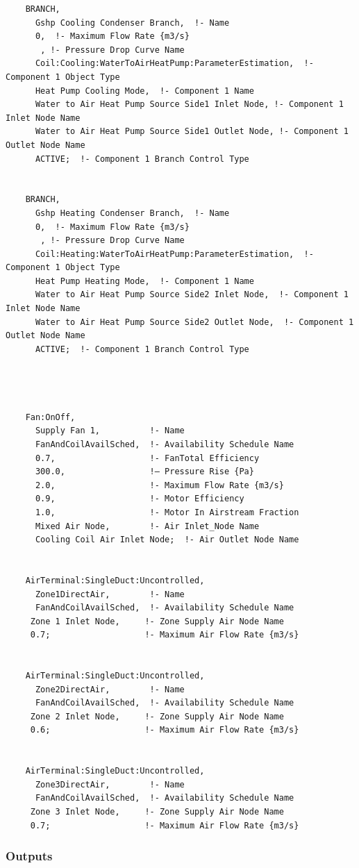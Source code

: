 \begin{lstlisting}
    BRANCH,
      Gshp Cooling Condenser Branch,  !- Name
      0,  !- Maximum Flow Rate {m3/s}
       , !- Pressure Drop Curve Name
      Coil:Cooling:WaterToAirHeatPump:ParameterEstimation,  !- Component 1 Object Type
      Heat Pump Cooling Mode,  !- Component 1 Name
      Water to Air Heat Pump Source Side1 Inlet Node, !- Component 1 Inlet Node Name
      Water to Air Heat Pump Source Side1 Outlet Node, !- Component 1 Outlet Node Name
      ACTIVE;  !- Component 1 Branch Control Type


    BRANCH,
      Gshp Heating Condenser Branch,  !- Name
      0,  !- Maximum Flow Rate {m3/s}
       , !- Pressure Drop Curve Name
      Coil:Heating:WaterToAirHeatPump:ParameterEstimation,  !- Component 1 Object Type
      Heat Pump Heating Mode,  !- Component 1 Name
      Water to Air Heat Pump Source Side2 Inlet Node,  !- Component 1 Inlet Node Name
      Water to Air Heat Pump Source Side2 Outlet Node,  !- Component 1 Outlet Node Name
      ACTIVE;  !- Component 1 Branch Control Type




    Fan:OnOff,
      Supply Fan 1,          !- Name
      FanAndCoilAvailSched,  !- Availability Schedule Name
      0.7,                   !- FanTotal Efficiency
      300.0,                 !– Pressure Rise {Pa}
      2.0,                   !- Maximum Flow Rate {m3/s}
      0.9,                   !- Motor Efficiency
      1.0,                   !- Motor In Airstream Fraction
      Mixed Air Node,        !- Air Inlet_Node Name
      Cooling Coil Air Inlet Node;  !- Air Outlet Node Name


    AirTerminal:SingleDuct:Uncontrolled,
      Zone1DirectAir,        !- Name
      FanAndCoilAvailSched,  !- Availability Schedule Name
     Zone 1 Inlet Node,     !- Zone Supply Air Node Name
     0.7;                   !- Maximum Air Flow Rate {m3/s}


    AirTerminal:SingleDuct:Uncontrolled,
      Zone2DirectAir,        !- Name
      FanAndCoilAvailSched,  !- Availability Schedule Name
     Zone 2 Inlet Node,     !- Zone Supply Air Node Name
     0.6;                   !- Maximum Air Flow Rate {m3/s}


    AirTerminal:SingleDuct:Uncontrolled,
      Zone3DirectAir,        !- Name
      FanAndCoilAvailSched,  !- Availability Schedule Name
     Zone 3 Inlet Node,     !- Zone Supply Air Node Name
     0.7;                   !- Maximum Air Flow Rate {m3/s}
\end{lstlisting}

\subsubsection{Outputs}\label{outputs-6-011}

